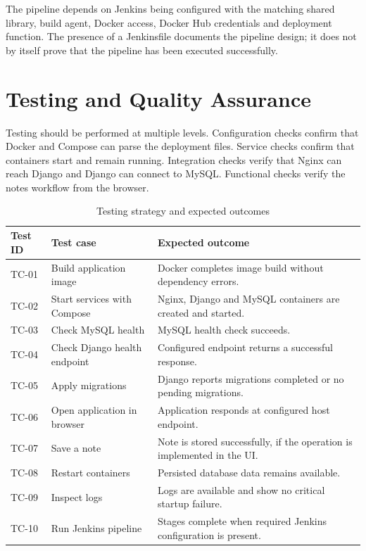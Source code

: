 \documentclass[12pt,a4paper,oneside]{report}
\begin{document}
The pipeline depends on Jenkins being configured with the matching shared library, build agent, Docker access, Docker Hub credentials and deployment function. The presence of a Jenkinsfile documents the pipeline design; it does not by itself prove that the pipeline has been executed successfully.

\section{Testing and Quality Assurance}
Testing should be performed at multiple levels. Configuration checks confirm that Docker and Compose can parse the deployment files. Service checks confirm that containers start and remain running. Integration checks verify that Nginx can reach Django and Django can connect to MySQL. Functional checks verify the notes workflow from the browser.

\begin{table}[H]
\centering
\small
\begin{tabularx}{\textwidth}{|p{}|p{}|X|}
\hline
\textbf{Test ID} & \textbf{Test case} & \textbf{Expected outcome}\\ \hline
TC-01 & Build application image & Docker completes image build without dependency errors.\\ \hline
TC-02 & Start services with Compose & Nginx, Django and MySQL containers are created and started.\\ \hline
TC-03 & Check MySQL health & MySQL health check succeeds.\\ \hline
TC-04 & Check Django health endpoint & Configured endpoint returns a successful response.\\ \hline
TC-05 & Apply migrations & Django reports migrations completed or no pending migrations.\\ \hline
TC-06 & Open application in browser & Application responds at configured host endpoint.\\ \hline
TC-07 & Save a note & Note is stored successfully, if the operation is implemented in the UI.\\ \hline
TC-08 & Restart containers & Persisted database data remains available.\\ \hline
TC-09 & Inspect logs & Logs are available and show no critical startup failure.\\ \hline
TC-10 & Run Jenkins pipeline & Stages complete when required Jenkins configuration is present.\\ \hline
\end{tabularx}
\caption{Testing strategy and expected outcomes}
\label{tab:testing}
\end{table}
\end{document}
